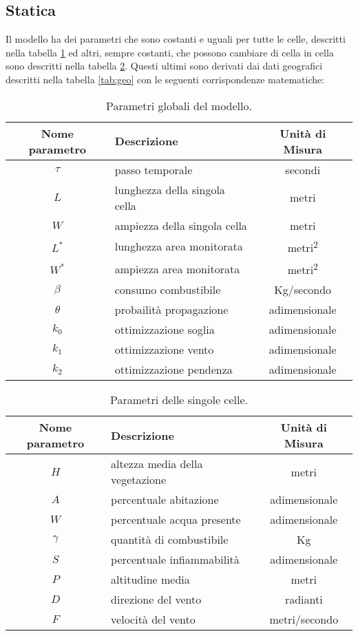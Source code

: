 \documentclass[draft]{article}
\newcommand{\combvar}{Kg}
\begin{document}
\subsection{Statica}\label{sec:statics}

Il modello ha dei parametri che sono costanti e uguali per tutte le celle,
descritti nella tabella \ref{tab:globals} ed altri, sempre costanti, che possono
cambiare di cella in cella sono descritti nella tabella \ref{tab:params}. Questi
ultimi sono derivati dai dati geografici descritti nella tabella \ref{tab:geo}
con le seguenti corrispondenze matematiche:

\begin{table}
\centering
\begin{tabular}{|c|l|c|}
	\hline
	\textbf{Nome parametro} & \textbf{Descrizione} & \textbf{Unità di Misura}\\
	\hline
	$\tau$ & passo temporale & secondi\\
	$L$ & lunghezza della singola cella & metri\\
	$W$ & ampiezza della singola cella & metri\\
	$L^*$ & lunghezza area monitorata & metri\textsuperscript{2}\\
	$W^*$ & ampiezza area monitorata & metri\textsuperscript{2}\\
	$\beta$ & consumo combustibile & \combvar/secondo\\
	$\theta$ & probailità propagazione & adimensionale\\
	$k_0$ & ottimizzazione soglia & adimensionale\\
	$k_1$ & ottimizzazione vento & adimensionale\\
	$k_2$ & ottimizzazione pendenza & adimensionale\\
	\hline
\end{tabular}
\caption{Parametri globali del modello.}
\label{tab:globals}
\end{table}

\begin{table}
\centering
\begin{tabular}{|c|l|c|}
	\hline
	\textbf{Nome parametro} & \textbf{Descrizione} & \textbf{Unità di Misura}\\
	\hline
	$H$ & altezza media della vegetazione & metri\\
	$A$ & percentuale abitazione & adimensionale\\
	$W$ & percentuale acqua presente & adimensionale\\
	$\gamma$ & quantità di combustibile & \combvar\\
	$S$ & percentuale infiammabilità & adimensionale\\
	$P$ & altitudine media & metri\\
	$D$ & direzione del vento & radianti\\
	$F$ & velocità del vento & metri/secondo\\
	\hline
\end{tabular}
\caption{Parametri delle singole celle.}
\label{tab:params}
\end{table}
\end{document}

